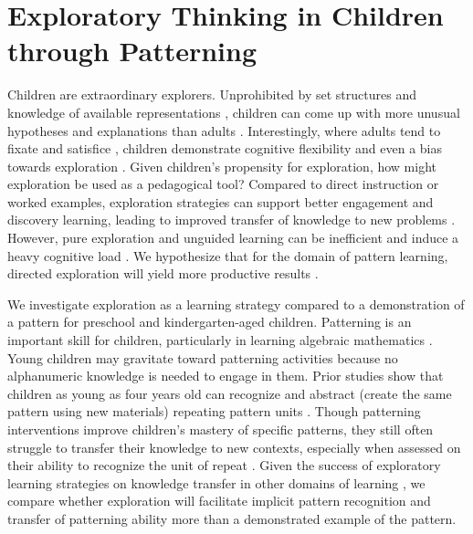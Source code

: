 \section{Exploratory Thinking in Children through Patterning}
Children are extraordinary explorers. Unprohibited by set structures and knowledge of available representations \cite{hinds2001,tversky1973availability,wiley1998expertise}, children can come up with more unusual hypotheses and explanations than adults \cite{gopnik2017,lucas2014children,wilson2021}. Interestingly, where adults tend to fixate and satisfice \cite{jansson1991design, kershaw2004, Ohlsson1992, simon1972theories}, children demonstrate cognitive flexibility and even a bias towards exploration \cite{gopnik2017,lucas2014children,sumner2019exploration,sumner2019}. Given children’s propensity for exploration, how might exploration be used as a pedagogical tool? Compared to direct instruction or worked examples, exploration strategies can support better engagement and discovery learning, leading to improved transfer of knowledge to new problems \cite{bonawitz2011double,Glogger-Frey2015,Schwartz2004}. However, pure exploration and unguided learning can be inefficient and induce a heavy cognitive load \cite{kirschner2006,tuovinen1999comparison}. We hypothesize that for the domain of pattern learning, directed exploration will yield more productive results \cite{Kapur2008,wilson2021}. 

We investigate exploration as a learning strategy compared to a demonstration of a pattern for preschool and kindergarten-aged children. Patterning is an important skill for children, particularly in learning algebraic mathematics \cite{papic2011assessing}. Young children may gravitate toward patterning activities because no alphanumeric knowledge is needed to engage in them. Prior studies show that children as young as four years old can recognize and abstract (create the same pattern using new materials) repeating pattern units \cite{fyfe2015,rittle2013}. Though patterning interventions improve children's mastery of specific patterns, they still often struggle to transfer their knowledge to new contexts, especially when assessed on their ability to recognize the unit of repeat \cite{fyfe2015,papic2007growth}. Given the success of exploratory learning strategies on knowledge transfer in other domains of learning \cite{bonawitz2011double,Glogger-Frey2015,Schwartz2004}, we compare whether exploration will facilitate implicit pattern recognition and transfer of patterning ability more than a demonstrated example of the pattern.

